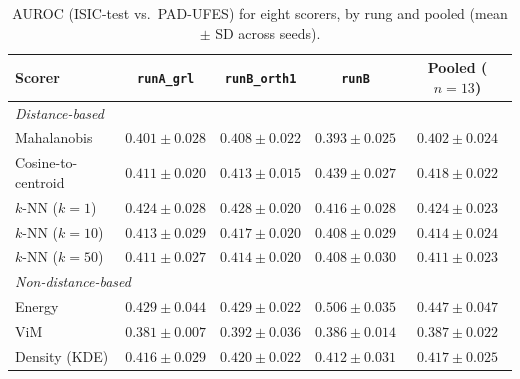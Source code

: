 \begin{table}[htbp]
\centering
\caption{AUROC (ISIC-test vs.\ PAD-UFES) for eight scorers, by rung and pooled (mean $\pm$ SD across seeds).}
\label{tab:scorer-summary}
\begin{tabular}{lcccc}
\toprule
Scorer & \texttt{runA\_grl} & \texttt{runB\_orth1} & \texttt{runB} & Pooled ($n=13$) \\
\midrule
\multicolumn{5}{l}{\textit{Distance-based}} \\
Mahalanobis         & $0.401 \pm 0.028$ & $0.408 \pm 0.022$ & $0.393 \pm 0.025$ & $0.402 \pm 0.024$ \\
Cosine-to-centroid  & $0.411 \pm 0.020$ & $0.413 \pm 0.015$ & $0.439 \pm 0.027$ & $0.418 \pm 0.022$ \\
$k$-NN ($k=1$)      & $0.424 \pm 0.028$ & $0.428 \pm 0.020$ & $0.416 \pm 0.028$ & $0.424 \pm 0.023$ \\
$k$-NN ($k=10$)     & $0.413 \pm 0.029$ & $0.417 \pm 0.020$ & $0.408 \pm 0.029$ & $0.414 \pm 0.024$ \\
$k$-NN ($k=50$)     & $0.411 \pm 0.027$ & $0.414 \pm 0.020$ & $0.408 \pm 0.030$ & $0.411 \pm 0.023$ \\
\midrule
\multicolumn{5}{l}{\textit{Non-distance-based}} \\
Energy              & $0.429 \pm 0.044$ & $0.429 \pm 0.022$ & $0.506 \pm 0.035$ & $0.447 \pm 0.047$ \\
ViM                 & $0.381 \pm 0.007$ & $0.392 \pm 0.036$ & $0.386 \pm 0.014$ & $0.387 \pm 0.022$ \\
Density (KDE)       & $0.416 \pm 0.029$ & $0.420 \pm 0.022$ & $0.412 \pm 0.031$ & $0.417 \pm 0.025$ \\
\bottomrule
\end{tabular}
\end{table}
